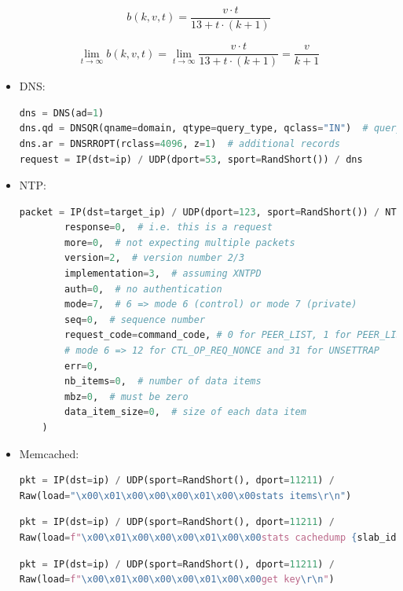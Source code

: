 \begin{figure}[htpb]
    \footnotesize
    \begin{equation}
     b(k, v,t) = \frac{v \cdot t}{13 + t \cdot (k + 1)}
    \label{eq:mem_baf}
    \end{equation}
    
    \begin{equation}
    \lim_{t \to \infty} b(k, v, t) = \lim_{t \to \infty} \frac{v \cdot t}{13 + t \cdot (k + 1)} = \frac{v}{k + 1}
    \label{eq:limit}
    \end{equation}
\end{figure}

\begin{itemize}
\item DNS:
\begin{lstlisting}[language=python, caption=DNS ``ANY'' request on ``.sl''., label=lst:measure_dns]
dns = DNS(ad=1)
dns.qd = DNSQR(qname=domain, qtype=query_type, qclass="IN")  # query section
dns.ar = DNSRROPT(rclass=4096, z=1)  # additional records
request = IP(dst=ip) / UDP(dport=53, sport=RandShort()) / dns
\end{lstlisting}
\item NTP:
\begin{lstlisting}[language=python, caption=NTP private Mode requests., label=lst:measure_ntp_private]
packet = IP(dst=target_ip) / UDP(dport=123, sport=RandShort()) / NTPPrivate(
        response=0,  # i.e. this is a request
        more=0,  # not expecting multiple packets
        version=2,  # version number 2/3
        implementation=3,  # assuming XNTPD
        auth=0,  # no authentication
        mode=7,  # 6 => mode 6 (control) or mode 7 (private)
        seq=0,  # sequence number
        request_code=command_code, # 0 for PEER_LIST, 1 for PEER_LIST_SUM, 16 for GET_RESTRICT
        # mode 6 => 12 for CTL_OP_REQ_NONCE and 31 for UNSETTRAP
        err=0,
        nb_items=0,  # number of data items
        mbz=0,  # must be zero
        data_item_size=0,  # size of each data item
    )
\end{lstlisting}
\item Memcached:
\begin{lstlisting}[language=python, caption=Memcached ``stats items'' request., label=lst:measure_mem_1]
pkt = IP(dst=ip) / UDP(sport=RandShort(), dport=11211) / 
Raw(load="\x00\x01\x00\x00\x00\x01\x00\x00stats items\r\n")
\end{lstlisting}
\begin{lstlisting}[language=python, caption=Memcached ``stats cachedump'' request., label=lst:measure_mem_2]
pkt = IP(dst=ip) / UDP(sport=RandShort(), dport=11211) / 
Raw(load=f"\x00\x01\x00\x00\x00\x01\x00\x00stats cachedump {slab_id} 0\r\n")
\end{lstlisting}
\begin{lstlisting}[language=python, caption=Memcached ``get $<key>$'' request., label=lst:measure_mem_3]
pkt = IP(dst=ip) / UDP(sport=RandShort(), dport=11211) / 
Raw(load=f"\x00\x01\x00\x00\x00\x01\x00\x00get key\r\n")
\end{lstlisting}

\end{itemize}



